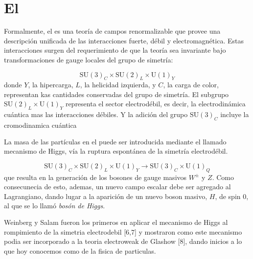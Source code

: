 \section{El \SM}

Formalmente, el {\SM} es una teoría de campos renormalizable
que provee una descripción unificada de las interacciones
fuerte, débil y electromagnética. Estas interacciones surgen
del requerimiento de que la teoría sea invariante bajo
transformaciones de gauge locales del grupo de simetría:


\begin{equation}
  \text{SU}(3)_C \times \text{SU}(2)_L \times \text{U}(1)_Y
\end{equation}
%
donde $Y$, la hipercarga, $L$, la helicidad izquierda, y $C$, la carga de color, representan
kas cantidades conservadas del grupo de simetría. El subgrupo $\text{SU}(2)_L \times \text{U}(1)_Y$
representa el sector electrodébil, es decir, la electrodinámica cuántica mas las interacciones
débiles. Y la adición del grupo $\text{SU}(3)_C$ incluye la cromodinamica cuántica



La masa de las part\'iculas en el {\SM} puede ser introducida mediante el llamado mecanismo
de Higgs\cite{PhysRevLett.13.321, PhysRevLett.13.508}, vía la ruptura espontánea de la simetría
electrodébil.

\begin{equation}
  \text{SU}(3)_C \times \text{SU}(2)_L \times \text{U}(1)_Y \to \text{SU}(3)_C \times \text{U}(1)_Q
\end{equation}
%
que resulta en la generación de los bosones de gauge masivos $W^\pm$ y $Z$. Como consecunecia de esto,
ademas, un nuevo campo escalar debe ser agregado al Lagrangiano, dando lugar a la
aparici\'on de un nuevo boson masivo, $H$, de spin 0, al que se lo llam\'o \emph{bos\'on de Higgs}.

Weinberg y Salam fueron los primeros en aplicar el mecanismo de Higgs al rompimiento de la
simetria electrodebil [6,7] y mostraron como este mecanismo podia ser incorporado a la teoria
electroweak de Glashow [8], dando inicios a lo que hoy conocemos como {\SM} de la fisica
de particulas.

